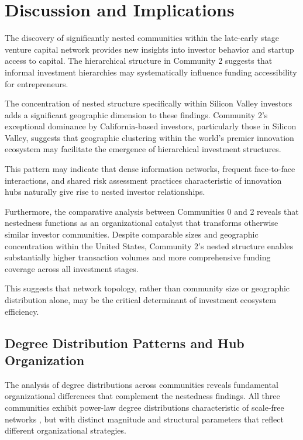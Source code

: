 
\section{Discussion and Implications}

The discovery of significantly nested communities within the late-early stage venture capital network provides new insights into investor behavior and startup access to capital. The hierarchical structure in Community 2 suggests that informal investment hierarchies may systematically influence funding accessibility for entrepreneurs.

The concentration of nested structure specifically within Silicon Valley investors adds a significant geographic dimension to these findings. Community 2's exceptional dominance by California-based investors, particularly those in Silicon Valley, suggests that geographic clustering within the world's premier innovation ecosystem may facilitate the emergence of hierarchical investment structures. 

This pattern may indicate that dense information networks, frequent face-to-face interactions, and shared risk assessment practices characteristic of innovation hubs naturally give rise to nested investor relationships.

Furthermore, the comparative analysis between Communities 0 and 2 reveals that nestedness functions as an organizational catalyst that transforms otherwise similar investor communities. Despite comparable sizes and geographic concentration within the United States, Community 2's nested structure enables substantially higher transaction volumes and more comprehensive funding coverage across all investment stages. 

This suggests that network topology, rather than community size or geographic distribution alone, may be the critical determinant of investment ecosystem efficiency.

\subsection{Degree Distribution Patterns and Hub Organization}

The analysis of degree distributions across communities reveals fundamental organizational differences that complement the nestedness findings. All three communities exhibit power-law degree distributions characteristic of scale-free networks \cite{Borgatti2011}, but with distinct magnitude and structural parameters that reflect different organizational strategies.

